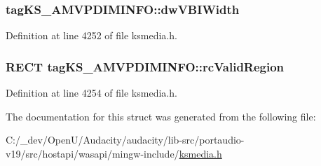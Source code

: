 \subsubsection[{\texorpdfstring{dw\+V\+B\+I\+Width}{dwVBIWidth}}]{ tag\+K\+S\+\_\+\+A\+M\+V\+P\+D\+I\+M\+I\+N\+F\+O\+::dw\+V\+B\+I\+Width}\hypertarget{structtag_k_s___a_m_v_p_d_i_m_i_n_f_o_ab966b321ddc728f2c1a64408d10ac353}{}\label{structtag_k_s___a_m_v_p_d_i_m_i_n_f_o_ab966b321ddc728f2c1a64408d10ac353}


Definition at line 4252 of file ksmedia.\+h.

\subsubsection[{\texorpdfstring{rc\+Valid\+Region}{rcValidRegion}}]{\setlength{\rightskip}{0pt plus 5cm}R\+E\+CT tag\+K\+S\+\_\+\+A\+M\+V\+P\+D\+I\+M\+I\+N\+F\+O\+::rc\+Valid\+Region}\hypertarget{structtag_k_s___a_m_v_p_d_i_m_i_n_f_o_a91668fe2a2ab25c0ed8d7c054fb631eb}{}\label{structtag_k_s___a_m_v_p_d_i_m_i_n_f_o_a91668fe2a2ab25c0ed8d7c054fb631eb}


Definition at line 4254 of file ksmedia.\+h.



The documentation for this struct was generated from the following file\+:\begin{DoxyCompactItemize}
\item 
C\+:/\+\_\+dev/\+Open\+U/\+Audacity/audacity/lib-\/src/portaudio-\/v19/src/hostapi/wasapi/mingw-\/include/\hyperlink{ksmedia_8h}{ksmedia.\+h}\end{DoxyCompactItemize}
